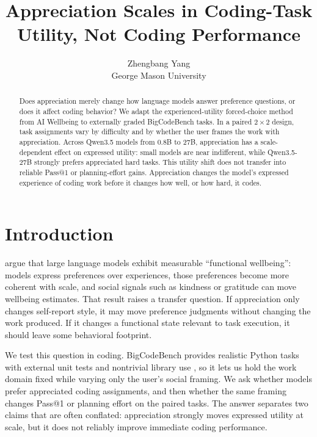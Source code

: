 \documentclass{article}
\title{Appreciation Scales in Coding-Task Utility, Not Coding Performance}
\author{Zhengbang Yang\\
George Mason University}
\begin{document}
\maketitle
{}

\vspace{-0.3in}
\begin{abstract}
Does appreciation merely change how language models answer preference
questions, or does it affect coding behavior? We adapt the experienced-utility
forced-choice method from AI Wellbeing to externally graded BigCodeBench tasks.
In a paired $2 \times 2$ design, task assignments vary by difficulty and by
whether the user frames the work with appreciation. Across Qwen3.5 models from
0.8B to 27B, appreciation has a scale-dependent effect on expressed utility:
small models are near indifferent, while Qwen3.5-27B strongly prefers
appreciated hard tasks. This utility shift does not transfer into reliable
Pass@1 or planning-effort gains. Appreciation changes the model's expressed
experience of coding work before it changes how well, or how hard, it codes.
\end{abstract}

\vspace{-0.2in}
\section{Introduction}
\vspace{-0.1in}
\citet{ren2026aiwellbeing} argue that large language models exhibit measurable
``functional wellbeing'': models express preferences over experiences, those
preferences become more coherent with scale, and social signals such as
kindness or gratitude can move wellbeing estimates. That result raises a
transfer question. If appreciation only changes self-report style, it may move
preference judgments without changing the work produced. If it changes a
functional state relevant to task execution, it should leave some behavioral
footprint.

We test this question in coding. BigCodeBench provides realistic Python tasks
with external unit tests and nontrivial library use \citep{zhuo2025bigcodebench},
so it lets us hold the work domain fixed while varying only the user's social
framing. We ask whether models prefer appreciated coding assignments, and then
whether the same framing changes Pass@1 or planning effort on the paired tasks.
The answer separates two claims that are often conflated: appreciation strongly
moves expressed utility at scale, but it does not reliably improve immediate
coding performance.
\end{document}
